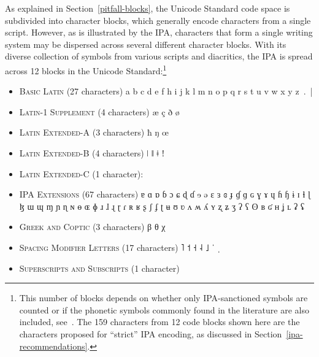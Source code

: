 As explained in Section~\ref{pitfall-blocks}, the Unicode Standard code space is
subdivided into character blocks, which generally encode characters from a
single script. However, as is illustrated by the IPA, characters that form a
single writing system may be dispersed across several different character
blocks. With its diverse collection of symbols from various scripts and
diacritics, the IPA is spread across 12 blocks in the Unicode
Standard:\footnote{This number of blocks depends on whether only IPA-sanctioned
symbols are counted or if the phonetic symbols commonly found in the literature
are also included, see~\cite[Appendix~C]{Moran2012}. The 159 characters from 12 
code blocks shown here are the characters proposed for ``strict'' IPA encoding, 
as discussed in Section~\ref{ipa-recommendations}.}

\begin{itemize}[itemsep=4pt]
	\item \textsc{Basic Latin }(27 characters) \newline 
	a b c d e f h i j k l m n o p q r s t u v w x y z~.~|
	\item \textsc{Latin-1 Supplement} (4 characters) \newline 
	æ ç ð ø
	\item \textsc{Latin Extended-A} (3 characters) \newline 
	ħ ŋ œ
	\item \textsc{Latin Extended-B} (4 characters) \newline 
	ǀ ǁ ǂ ǃ
	\item \textsc{Latin Extended-C} (1 character): \newline
	\item \textsc{IPA Extensions} (67 characters) \newline 
	ɐ ɑ ɒ ɓ ɔ ɕ ɖ ɗ ɘ ə ɛ ɜ ɞ ɟ ɠ ɡ ɢ ɣ ɤ ɥ ɦ ɧ ɨ ɪ ɬ ɭ ɮ ɯ ɰ ɱ ɲ ɳ ɴ \newline
	ɵ ɶ ɸ ɹ ɺ ɻ ɽ ɾ ʀ ʁ ʂ ʃ ʄ ʈ ʉ ʊ ʋ ʌ ʍ ʎ ʏ ʐ ʑ ʒ ʔ ʕ ʘ ʙ ʛ ʜ ʝ ʟ ʡ ʢ 
	\item \textsc{Greek and Coptic} (3 characters) \newline 
	β θ χ
	\item \textsc{Spacing Modifier Letters} (17 characters) \newline
	      
	    ˥ ˦ ˧ ˨ ˩ {\large ˈ ˌ}
	\item \textsc{Superscripts and Subscripts} (1 character) \newline

\end{itemize}
